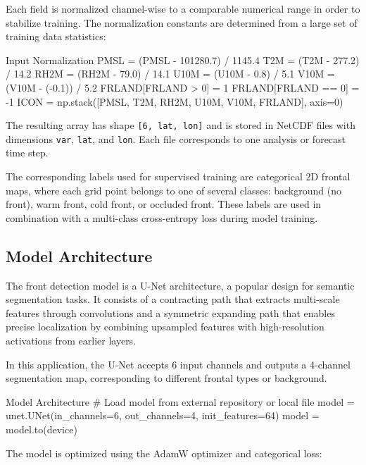 Each field is normalized channel-wise to a comparable numerical range in order to stabilize training. The normalization constants are determined from a large set of training data statistics:

\begin{codeonly}{Input Normalization}
PMSL = (PMSL - 101280.7) / 1145.4
T2M  = (T2M  - 277.2)    / 14.2
RH2M = (RH2M - 79.0)     / 14.1
U10M = (U10M - 0.8)      / 5.1
V10M = (V10M - (-0.1))   / 5.2
FRLAND[FRLAND > 0] = 1
FRLAND[FRLAND == 0] = -1
ICON = np.stack([PMSL, T2M, RH2M, U10M, V10M, FRLAND], axis=0)
\end{codeonly}

The resulting array has shape \texttt{[6, lat, lon]} and is stored in NetCDF files with dimensions \texttt{var}, \texttt{lat}, and \texttt{lon}. Each file corresponds to one analysis or forecast time step.

The corresponding labels used for supervised training are categorical 2D frontal maps, where each grid point belongs to one of several classes: background (no front), warm front, cold front, or occluded front. These labels are used in combination with a multi-class cross-entropy loss during model training.



\subsection{Model Architecture}

The front detection model is a U-Net architecture, a popular design for semantic segmentation tasks. It consists of a contracting path that extracts multi-scale features through convolutions and a symmetric expanding path that enables precise localization by combining upsampled features with high-resolution activations from earlier layers.

In this application, the U-Net accepts 6 input channels and outputs a 4-channel segmentation map, corresponding to different frontal types or background.

\begin{codeonly}{Model Architecture}
# Load model from external repository or local file
model = unet.UNet(in_channels=6, out_channels=4, init_features=64)
model = model.to(device)
\end{codeonly}

The model is optimized using the AdamW optimizer and categorical loss:

